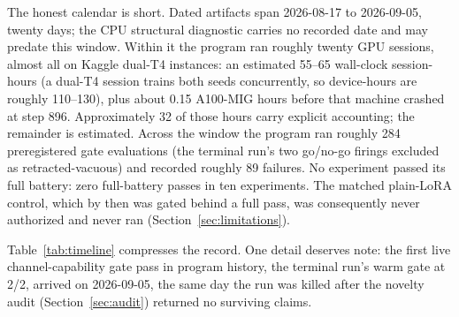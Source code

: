 \documentclass[10pt,a4paper]{article}
\begin{document}
The honest calendar is short. Dated artifacts span 2026-08-17 to 2026-09-05,
twenty days; the CPU structural diagnostic carries no recorded date and may
predate this window. Within it the program ran roughly twenty GPU sessions,
almost all on Kaggle dual-T4 instances: an estimated 55--65 wall-clock
session-hours (a dual-T4 session trains both seeds concurrently, so
device-hours are roughly 110--130), plus about 0.15 A100-MIG hours before that
machine crashed at step 896. Approximately 32 of those hours carry explicit
accounting; the remainder is estimated. Across the window the program ran
roughly 284 preregistered gate evaluations (the terminal run's two go/no-go
firings excluded as retracted-vacuous) and recorded roughly 89 failures. No
experiment passed its full battery: zero full-battery passes in ten
experiments. The matched plain-LoRA control, which by then was gated behind a
full pass, was consequently never authorized and never ran
(Section~\ref{sec:limitations}).

Table~\ref{tab:timeline} compresses the record. One detail deserves note: the
first live channel-capability gate pass in program history, the terminal run's
warm gate at 2/2, arrived on 2026-09-05, the same day the run was killed after
the novelty audit (Section~\ref{sec:audit}) returned no surviving claims.
\end{document}
